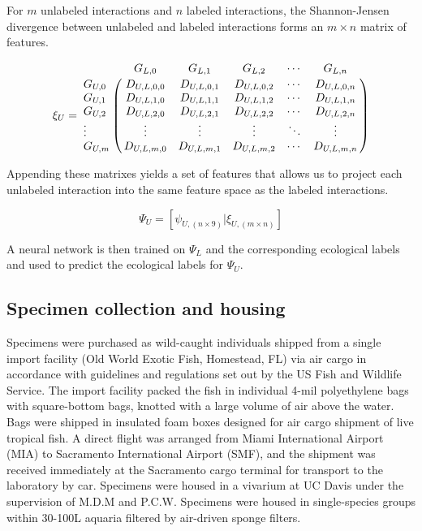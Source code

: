 \noindent For $m$ unlabeled interactions and $n$ labeled interactions, the Shannon-Jensen divergence between unlabeled and labeled interactions forms an $m\times n$ matrix of features.

\begin{equation}
\xi_U =
\bordermatrix{
        & G_{L,0}     & G_{L,1}     & G_{L,2}     & \cdots & G_{L,n}     \cr
G_{U,0} & D_{U,L,0,0} & D_{U,L,0,1} & D_{U,L,0,2} & \cdots & D_{U,L,0,n} \cr
G_{U,1} & D_{U,L,1,0} & D_{U,L,1,1} & D_{U,L,1,2} & \cdots & D_{U,L,1,n} \cr
G_{U,2} & D_{U,L,2,0} & D_{U,L,2,1} & D_{U,L,2,2} & \cdots & D_{U,L,2,n} \cr
\vdots  & \vdots      & \vdots      & \vdots      & \ddots & \vdots      \cr
G_{U,m} & D_{U,L,m,0} & D_{U,L,m,1} & D_{U,L,m,2} & \cdots & D_{U,L,m,n} \cr
}
\end{equation}

\noindent Appending these matrixes yields a set of features that allows us to project each unlabeled interaction into the same feature space as the labeled interactions.

\begin{equation}
    \Psi_{U} = \left[ \psi_{U,(n \times 9)} | \xi_{U,(m \times n)} \right]
\end{equation}

\noindent A neural network is then trained on $\Psi_L$ and the corresponding ecological labels and used to predict the ecological labels for $\Psi_U$. \cite{pedregosa2011scikit}

\subsection{Specimen collection and housing}

Specimens were purchased as wild-caught individuals shipped from a single import facility (Old World Exotic Fish, Homestead, FL) via air cargo in accordance with guidelines and regulations set out by the US Fish and Wildlife Service. \cite{NASanimals} The import facility packed the fish in individual 4-mil polyethylene bags with square-bottom bags, knotted with a large volume of air above the water. Bags were shipped in insulated foam boxes designed for air cargo shipment of live tropical fish. A direct flight was arranged from Miami International Airport (MIA) to Sacramento International Airport (SMF), and the shipment was received immediately at the Sacramento cargo terminal for transport to the laboratory by car. Specimens were housed in a vivarium at UC Davis under the supervision of M.D.M and P.C.W. Specimens were housed in single-species groups within 30-100L aquaria filtered by air-driven sponge filters.

